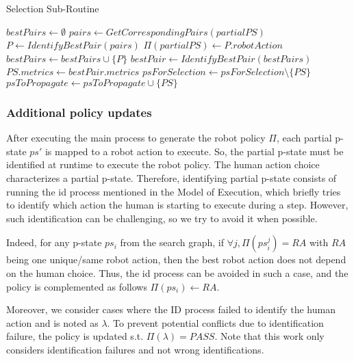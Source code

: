 \begin{algorithm}
\caption{Selection Sub-Routine}\label{alg:selection}
\begin{algorithmic}[1]

        \State $bestPairs \gets \emptyset$
            \State $pairs \gets GetCorrespondingPairs(partialPS)$
            \State $P \gets IdentifyBestPair(pairs)$ 
            \State $\Pi(partialPS) \gets P.robotAction$
            \State $bestPairs \gets bestPairs \cup \{P\}$
        \EndFor
        \State 
        \State $bestPair \gets IdentifyBestPair(bestPairs)$
        \State 
        \State $PS.metrics \gets bestPair.metrics$
        \State $psForSelection \gets psForSelection \setminus \{PS\}$
        \State $psToPropagate \gets psToPropagate \cup \{PS\}$
    \EndIf
\EndFor

\end{algorithmic}
\end{algorithm}

    \subsubsection{Additional policy updates}

After executing the main process to generate the robot policy $\Pi$, each partial p-state $ps'$ is mapped to a robot action to execute. So, the partial p-state must be identified at runtime to execute the robot policy. 
The human action choice characterizes a partial p-state. Therefore, identifying partial p-state consists of running the \acrshort{id} process mentioned in the Model of Execution, which briefly tries to identify which action the human is starting to execute during a step. However, such identification can be challenging, so we try to avoid it when possible. 

Indeed, for any p-state $ps_i$ from the search graph, if $\forall j, \Pi(ps_i^j) = RA$ with $RA$ being one unique/same robot action, then the best robot action does not depend on the human choice. Thus, the \acrshort{id} process can be avoided in such a case, and the policy is complemented as follows $\Pi(ps_i) \gets RA$.

Moreover, we consider cases where the ID process failed to identify the human action and is noted as $\lambda$. To prevent potential conflicts due to identification failure, the policy is updated s.t. $\Pi(\lambda) = PASS$.
Note that this work only considers identification failures and not wrong identifications. 


